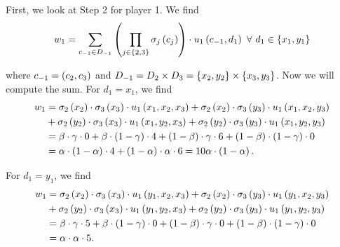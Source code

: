 \begin{enumerate} [label=\Alph*. ]
	      	      
	      	      
	      	      
	      First, we look at Step 2 for player 1. We find
	      \begin{equation*}
	      	w_1 = \sum_{c_{-1} \in D_{-1}} \left(\prod_{j \in \left\{2,3\right\}} \sigma_{j} \left(c_{j}\right) \right) \cdot u_{1} \left(c_{-1}, d_1\right) \ \forall \ d_{1} \in \left\{x_1, y_1\right\}
	      \end{equation*}
	      	              
	      where $c_{-1} = \left(c_2, c_3\right)$ and $D_{-1} = D_{2} \times D_{3} = \left\{x_2, y_2\right\} \times \left\{x_3, y_3\right\}$.
	      Now we will compute the sum.
	      For $d_1 = x_1$, we find
	      \begin{align*}
	      	w_1
	      	  & = \sigma_{2} \left(x_{2}\right) \cdot \sigma_{3} \left(x_{3}\right) \cdot u_{1} \left(x_1, x_2, x_3\right)   
	      	+   \sigma_{2} \left(x_{2}\right) \cdot \sigma_{3} \left(y_{3}\right) \cdot u_{1} \left(x_1, x_2, y_3\right) \\
	      	  & +   \sigma_{2} \left(y_{2}\right) \cdot \sigma_{3} \left(x_{3}\right) \cdot u_{1} \left(x_1, y_2, x_3\right) 
	      	+   \sigma_{2} \left(y_{2}\right) \cdot \sigma_{3} \left(y_{3}\right) \cdot u_{1} \left(x_1, y_2, y_3\right) \\
	      	  & = \beta \cdot \gamma \cdot 0                                                                     
	      	+   \beta \cdot \left(1 - \gamma\right) \cdot 4
	      	+   \left(1 - \beta\right) \cdot \gamma \cdot 6
	      	+   \left(1 - \beta\right) \cdot \left(1 - \gamma\right) \cdot 0 \\
	      	  & = \alpha \cdot \left(1 - \alpha\right) \cdot 4                                                       
	      	+   \left(1 - \alpha\right) \cdot \alpha \cdot 6
	      	= 10 \alpha \cdot \left(1 - \alpha\right).
	      \end{align*}
	      	              
	      For $d_1 = y_1$, we find
	      \begin{align*}
	      	w_1
	      	  & = \sigma_{2} \left(x_{2}\right) \cdot \sigma_{3} \left(x_{3}\right) \cdot u_{1} \left(y_1, x_2, x_3\right)   
	      	+   \sigma_{2} \left(x_{2}\right) \cdot \sigma_{3} \left(y_{3}\right) \cdot u_{1} \left(y_1, x_2, y_3\right) \\
	      	  & +   \sigma_{2} \left(y_{2}\right) \cdot \sigma_{3} \left(x_{3}\right) \cdot u_{1} \left(y_1, y_2, x_3\right) 
	      	+   \sigma_{2} \left(y_{2}\right) \cdot \sigma_{3} \left(y_{3}\right) \cdot u_{1} \left(y_1, y_2, y_3\right) \\
	      	  & = \beta \cdot \gamma \cdot 5                                                                     
	      	+   \beta \cdot \left(1 - \gamma\right) \cdot 0
	      	+   \left(1 - \beta\right) \cdot \gamma \cdot 0
	      	+   \left(1 - \beta\right) \cdot \left(1 - \gamma\right) \cdot 0 \\
	      	  & = \alpha \cdot \alpha \cdot 5.                                                                   
	      \end{align*}
	      	      

\end{enumerate}
